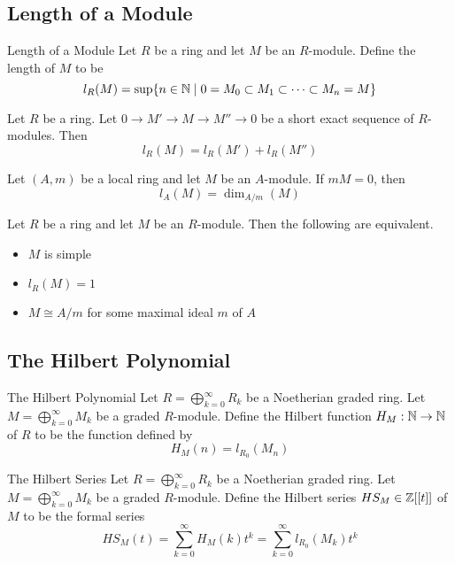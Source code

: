 \documentclass[a4paper]{article}
\begin{document}
\subsection{Length of a Module}
\begin{defn}{Length of a Module}{} Let $R$ be a ring and let $M$ be an $R$-module. Define the length of $M$ to be $$l_R(M)=\text{sup}\{n\in\mathbb{N}\;|\;0=M_0\subset M_1\subset\cdots\subset M_n=M\}$$
\end{defn}

\begin{lmm}{}{} Let $R$ be a ring. Let $0\to M'\to M\to M''\to 0$ be a short exact sequence of $R$-modules. Then $$l_R(M)=l_R(M')+l_R(M'')$$
\end{lmm}

\begin{lmm}{}{} Let $(A,m)$ be a local ring and let $M$ be an $A$-module. If $mM=0$, then $$l_A(M)=\dim_{A/m}(M)$$
\end{lmm}

\begin{prp}{}{} Let $R$ be a ring and let $M$ be an $R$-module. Then the following are equivalent. 
\begin{itemize}
\item $M$ is simple
\item $l_R(M)=1$
\item $M\cong A/m$ for some maximal ideal $m$ of $A$
\end{itemize}
\end{prp}

\subsection{The Hilbert Polynomial}
\begin{defn}{The Hilbert Polynomial}{} Let $R=\bigoplus_{k=0}^\infty R_k$ be a Noetherian graded ring. Let $M=\bigoplus_{k=0}^\infty M_k$ be a graded $R$-module. Define the Hilbert function $H_M:\mathbb{N}\to\mathbb{N}$ of $R$ to be the function defined by $$H_M(n)=l_{R_0}(M_n)$$
\end{defn}

\begin{defn}{The Hilbert Series}{} Let $R=\bigoplus_{k=0}^\infty R_k$ be a Noetherian graded ring. Let $M=\bigoplus_{k=0}^\infty M_k$ be a graded $R$-module. Define the Hilbert series $HS_M\in\mathbb{Z}[[t]]$ of $M$ to be the formal series $$HS_M(t)=\sum_{k=0}^\infty H_M(k)t^k=\sum_{k=0}^\infty l_{R_0}(M_k)t^k$$
\end{defn}
\end{document}
